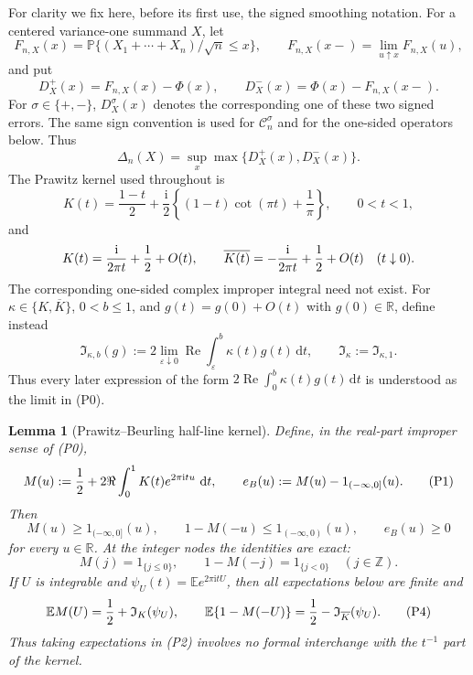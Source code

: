 \documentclass[11pt,a4paper]{article}
\numberwithin{equation}{section}
\newtheorem{lemma}[theorem]{Lemma}
\theoremstyle{definition}
\theoremstyle{remark}
\newcommand{\E}{\mathbb E}
\newcommand{\Pp}{\mathbb P}
\newcommand{\ii}{\mathrm i}
\newcommand{\dd}{\,\mathrm d}
\begin{document}
For clarity we fix here, before its first use, the signed smoothing notation.
For a centered variance-one summand $X$, let
\[
 F_{n,X}(x)=\Pp\{(X_1+\cdots+X_n)/\sqrt n\le x\},\qquad
 F_{n,X}(x-)=\lim_{u\uparrow x}F_{n,X}(u),
\]
and put
\[
 D_X^+(x)=F_{n,X}(x)-\Phi(x),\qquad
 D_X^-(x)=\Phi(x)-F_{n,X}(x-).
\]
For \(\sigma\in\{+,-\}\), \(D_X^\sigma(x)\) denotes the corresponding
one of these two signed errors.  The same sign convention is used for
\(\mathcal C_n^\sigma\) and for the one-sided operators below.
Thus
\[
 \Delta_n(X)=\sup_x\max\{D_X^+(x),D_X^-(x)\}.
\]
The Prawitz kernel used throughout is
\[
 K(t)=\frac{1-t}{2}+\frac{\ii}{2}
 \left\{(1-t)\cot(\pi t)+\frac1\pi\right\},\qquad0<t<1,
\]
and
\[
 K(t)={\ii\over2\pi t}+{1\over2}+O(t),\qquad
 \overline{K(t)}=-{\ii\over2\pi t}+{1\over2}+O(t)
 \quad(t\downarrow0).
\]
The corresponding one-sided complex improper integral need not exist.  For
$\kappa\in\{K,\overline K\}$, $0<b\le1$, and
$g(t)=g(0)+O(t)$ with $g(0)\in\mathbb R$, define instead
\[
 \mathfrak I_{\kappa,b}(g):=
 2\lim_{\varepsilon\downarrow0}\operatorname {Re}
       \int_\varepsilon^b\kappa(t)g(t)\dd t,\qquad
 \mathfrak I_\kappa:=\mathfrak I_{\kappa,1}.              \tag{P0}
\]
Thus every later expression of the form
$2\operatorname {Re}\int_0^b\kappa(t)g(t)\dd t$ is understood as the
limit in (P0).

\begin{lemma}[Prawitz--Beurling half-line kernel]\label{orig:lem:BPcardinal}
Define, in the real-part improper sense of \emph{(P0)},
\[
 M(u):={1\over2}+2\Re\int_0^1K(t)e^{2\pi\ii tu}\,\dd t,
 \qquad e_B(u):=M(u)-1_{(-\infty,0]}(u).                 \tag{P1}
\]
Then
\[
 M(u)\ge1_{(-\infty,0]}(u),\qquad
 1-M(-u)\le1_{(-\infty,0)}(u),\qquad e_B(u)\ge0         \tag{P2}
\]
for every $u\in\mathbb R$.  At the integer nodes the identities are exact:
\[
             M(j)=1_{\{j\le0\}},\qquad
             1-M(-j)=1_{\{j<0\}}\quad(j\in\mathbb Z).  \tag{P3}
\]
If $U$ is integrable and $\psi_U(t)=\E e^{2\pi\ii tU}$, then all
expectations below are finite and
\[
 \E M(U)={1\over2}+\mathfrak I_K(\psi_U),\qquad
 \E\{1-M(-U)\}={1\over2}-\mathfrak I_{\overline K}(\psi_U). \tag{P4}
\]
Thus taking expectations in (P2) involves no formal interchange with the
$t^{-1}$ part of the kernel.
\end{lemma}
\end{document}
